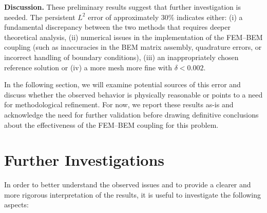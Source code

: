 \documentclass[11pt,onecolumn]{article}
\begin{document}
\textbf{Discussion.}
These preliminary results suggest that further investigation is needed. The persistent $L^2$ error of approximately $30\%$ indicates either:
(i) a fundamental discrepancy between the two methods that requires deeper theoretical analysis,
(ii) numerical issues in the implementation of the FEM--BEM coupling (such as inaccuracies in the BEM matrix assembly, quadrature errors, or incorrect handling of boundary conditions),
(iii) an inappropriately chosen reference solution or (iv) a more mesh more fine with $\delta<0.002$.

In the following section, we will examine potential sources of this error and discuss whether the observed behavior is physically reasonable or points to a need for methodological refinement. For now, we report these results as-is and acknowledge the need for further validation before drawing definitive conclusions about the effectiveness of the FEM--BEM coupling for this problem.


\section{Further Investigations}
In order to better understand the observed issues and to provide a clearer and more rigorous interpretation of the results, it is useful to investigate the following aspects:
\end{document}
